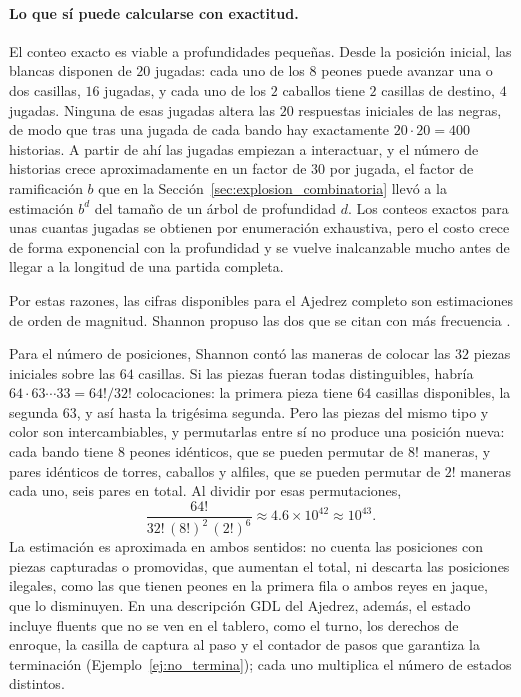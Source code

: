 \paragraph{Lo que sí puede calcularse con exactitud.} El conteo exacto es viable a profundidades pequeñas. Desde la posición inicial, las blancas disponen de $20$ jugadas: cada uno de los $8$ peones puede avanzar una o dos casillas, $16$ jugadas, y cada uno de los $2$ caballos tiene $2$ casillas de destino, $4$ jugadas. Ninguna de esas jugadas altera las $20$ respuestas iniciales de las negras, de modo que tras una jugada de cada bando hay exactamente $20 \cdot 20 = 400$ historias. A partir de ahí las jugadas empiezan a interactuar, y el número de historias crece aproximadamente en un factor de $30$ por jugada, el factor de ramificación $b$ que en la Sección~\ref{sec:explosion_combinatoria} llevó a la estimación $b^d$ del tamaño de un árbol de profundidad $d$. Los conteos exactos para unas cuantas jugadas se obtienen por enumeración exhaustiva, pero el costo crece de forma exponencial con la profundidad y se vuelve inalcanzable mucho antes de llegar a la longitud de una partida completa.

Por estas razones, las cifras disponibles para el Ajedrez completo son estimaciones de orden de magnitud. Shannon propuso las dos que se citan con más frecuencia \cite{Shannon1950}.

Para el número de posiciones, Shannon contó las maneras de colocar las $32$ piezas iniciales sobre las $64$ casillas. Si las piezas fueran todas distinguibles, habría $64 \cdot 63 \cdots 33 = 64!/32!$ colocaciones: la primera pieza tiene $64$ casillas disponibles, la segunda $63$, y así hasta la trigésima segunda. Pero las piezas del mismo tipo y color son intercambiables, y permutarlas entre sí no produce una posición nueva: cada bando tiene $8$ peones idénticos, que se pueden permutar de $8!$ maneras, y pares idénticos de torres, caballos y alfiles, que se pueden permutar de $2!$ maneras cada uno, seis pares en total. Al dividir por esas permutaciones,
\begin{equation}
    \frac{64!}{32!\,(8!)^2\,(2!)^6} \approx 4.6 \times 10^{42} \approx 10^{43}.
    \label{eq:an_shannon_posiciones}
\end{equation}
La estimación es aproximada en ambos sentidos: no cuenta las posiciones con piezas capturadas o promovidas, que aumentan el total, ni descarta las posiciones ilegales, como las que tienen peones en la primera fila o ambos reyes en jaque, que lo disminuyen. En una descripción GDL del Ajedrez, además, el estado incluye fluents que no se ven en el tablero, como el turno, los derechos de enroque, la casilla de captura al paso y el contador de pasos que garantiza la terminación (Ejemplo~\ref{ej:no_termina}); cada uno multiplica el número de estados distintos.

